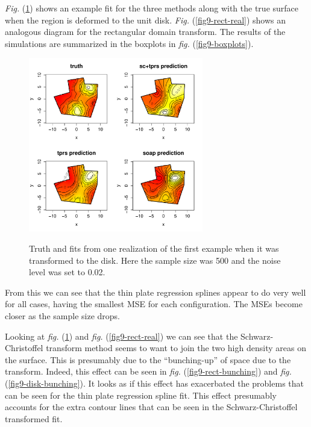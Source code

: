 \documentclass[a4paper,10pt]{amsart}
\newcommand{\sch}{Schwarz-Christoffel }
\newcommand{\fig}[1]{\emph{fig.} (\ref{#1})}
\newcommand{\Fig}[1]{\emph{Fig.} (\ref{#1})}
\begin{document}
\Fig{fig9-disk-real} shows an example fit for the three methods along with the true surface when the region is deformed to the unit disk. \Fig{fig9-rect-real} shows an analogous diagram for the rectangular domain transform. The results of the simulations are summarized in the boxplots in \fig{fig9-boxplots}.

\begin{figure}[tbp]
\centering
\includegraphics[width=3in]{figs-otherdomains/fig9-disk-real.pdf} \\
\caption{Truth and fits from one realization of the first example when it was transformed to the disk. Here the sample size was 500 and the noise level was set to 0.02.}
\label{fig9-disk-real}
\end{figure}

From this we can see that the thin plate regression splines appear to do very well for all cases, having the smallest MSE for each configuration. The MSEs become closer as the sample size drops.

Looking at \fig{fig9-disk-real} and \fig{fig9-rect-real} we can see that the \sch transform method seems to want to join the two high density areas on the surface. This is presumably due to the ``bunching-up'' of space due to the transform. Indeed, this effect can be seen in \fig{fig9-rect-bunching} and \fig{fig9-disk-bunching}. It looks as if this effect has exacerbated the problems that can be seen for the thin plate regression spline fit. This effect presumably accounts for the extra contour lines that can be seen in the \sch transformed fit.
\end{document}
